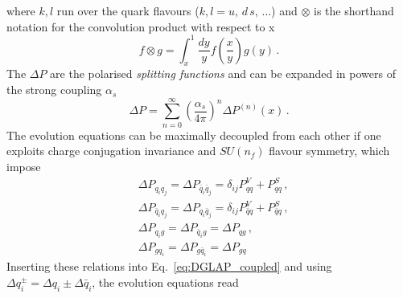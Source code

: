 where $k,l$ run over the quark flavours ($k,l = u,\, d\, s,\, \dots$) and $\otimes$ is the shorthand notation for the convolution product with respect to x
\begin{equation}
  f \otimes g = \int_{x}^{1} \frac{dy}{y} f \left(\frac{x}{y} \right) g(y) \,.
  \label{eq:def_conv}
\end{equation}
The $\Delta P$ are the polarised \textit{splitting functions} and can be expanded in powers of the strong coupling $\alpha_s$
\begin{equation}
  \Delta P = \sum_{n=0}^{\infty} \left( \frac{\alpha_s}{4\pi} \right)^{n} \Delta P^{(n)}(x)\,.
\end{equation}
The evolution equations can be maximally decoupled from each other if one exploits charge conjugation invariance and $SU(n_f)$ flavour symmetry, which impose 
\begin{equation}
  \begin{split}
    & \Delta P_{q_i q_j} = \Delta P_{\bar{q}_i \bar{q}_j} = \delta_{ij} P_{qq}^{V} + P_{qq}^{S} \,,\\
    & \Delta P_{\bar{q}_i q_j} = \Delta P_{q_i \bar{q}_j} = \delta_{ij} P_{\bar{q}q}^{V} + P_{\bar{q}q}^{S} \,,\\
    & \Delta P_{q_i g} = \Delta P_{\bar{q}_i g} = \Delta P_{qg} \,, \\
    & \Delta P_{g q_i} = \Delta P_{g \bar{q}_i} = \Delta P_{gq}
  \end{split}
\end{equation}
Inserting these relations into Eq.~\eqref{eq:DGLAP_coupled} and using $\Delta q_{i}^{\pm} = \Delta q_{i} \pm \Delta \bar{q}_{i}$,
the evolution equations read 
